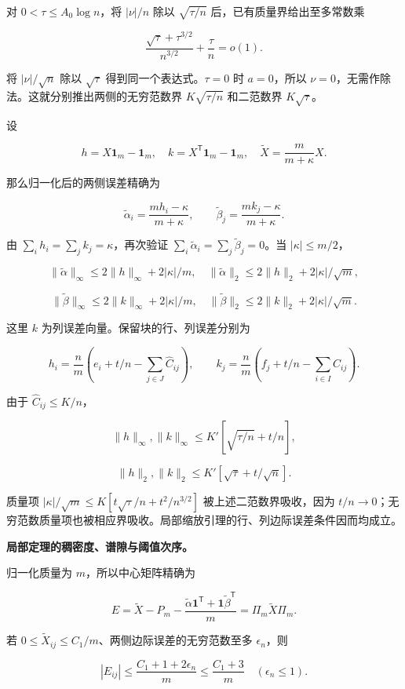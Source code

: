 \documentclass[11pt,a4paper]{article}
\begin{document}
对 \(0<\tau\le A_0\log n\)，将 \(|\nu|/n\) 除以 \(\sqrt{\tau/n}\) 后，已有质量界给出至多常数乘

\[\frac{\sqrt\tau+\tau^{3/2}}{n^{3/2}}+\frac\tau n=o(1).\]

将 \(|\nu|/\sqrt n\) 除以 \(\sqrt\tau\) 得到同一个表达式。\(\tau=0\) 时 \(a=0\)，所以 \(\nu=0\)，无需作除法。这就分别推出两侧的无穷范数界 \(K\sqrt{\tau/n}\) 和二范数界 \(K\sqrt\tau\)。

设

\[h=X\mathbf1_m-\mathbf1_m,\quad
k=X^{\mathsf T}\mathbf1_m-\mathbf1_m,\quad
\widetilde X=\frac m{m+\kappa}X.\]

那么归一化后的两侧误差精确为

\[\widetilde\alpha_i=\frac{mh_i-\kappa}{m+\kappa},\qquad
\widetilde\beta_j=\frac{mk_j-\kappa}{m+\kappa}.\]

由 \(\sum_ih_i=\sum_jk_j=\kappa\)，再次验证 \(\sum_i\widetilde\alpha_i=\sum_j\widetilde\beta_j=0\)。当 \(|\kappa|\le m/2\)，

\[\|\widetilde\alpha\|_\infty\le2\|h\|_\infty+2|\kappa|/m,
\quad\|\widetilde\alpha\|_2\le2\|h\|_2+2|\kappa|/\sqrt m,\]

\[\|\widetilde\beta\|_\infty\le2\|k\|_\infty+2|\kappa|/m,
\quad\|\widetilde\beta\|_2\le2\|k\|_2+2|\kappa|/\sqrt m.\]

这里 \(k\) 为列误差向量。保留块的行、列误差分别为

\[h_i=\frac nm\left(e_i+t/n-\sum_{j\in J}\widehat C_{ij}\right),\qquad
k_j=\frac nm\left(f_j+t/n-\sum_{i\in I}\widehat C_{ij}\right).\]

由于 \(\widehat C_{ij}\le K/n\)，

\[\|h\|_\infty,\|k\|_\infty\le K'[\sqrt{\tau/n}+t/n],\]

\[\|h\|_2,\|k\|_2\le K'[\sqrt\tau+t/\sqrt n].\]

质量项 \(|\kappa|/\sqrt m\le K[t\sqrt\tau/n+t^2/n^{3/2}]\) 被上述二范数界吸收，因为 \(t/n\to0\)；无穷范数质量项也被相应界吸收。局部缩放引理的行、列边际误差条件因而均成立。

\textbf{局部定理的稠密度、谱隙与阈值次序。}

归一化质量为 \(m\)，所以中心矩阵精确为

\[E=\widetilde X-P_m-\frac{\widetilde\alpha\mathbf1^{\mathsf T}
+\mathbf1\widetilde\beta^{\mathsf T}}m
=\Pi_m\widetilde X\Pi_m.\]

若 \(0\le\widetilde X_{ij}\le C_1/m\)、两侧边际误差的无穷范数至多 \(\epsilon_n\)，则

\[|E_{ij}|\le\frac{C_1+1+2\epsilon_n}{m}\le\frac{C_1+3}{m}
\quad(\epsilon_n\le1).\]
\end{document}
